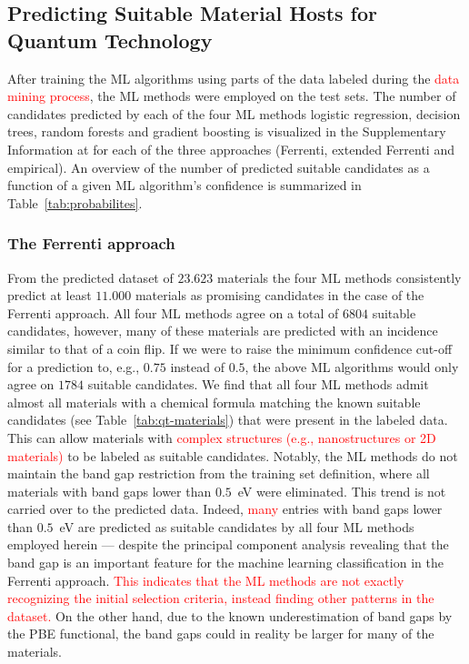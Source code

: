 \documentclass[superscriptaddress,unsortedaddress,
 amsmath,amssymb,
 aps,
]{revtex4-2}
\newcommand{\mrk}[1]{\textcolor{red}{#1}}
\begin{document}
\subsection*{Predicting Suitable Material Hosts for Quantum Technology} 
After training the ML algorithms using parts of the data labeled during the \mrk{data mining process}, the ML methods were employed on the test sets. 
The number of candidates predicted by each of the four ML methods logistic regression, decision trees, random forests and gradient boosting is visualized in the Supplementary Information at \cite{supplementary} for each of the three approaches (Ferrenti, extended Ferrenti and empirical). 
An overview of the number of predicted suitable candidates as a function of a given ML algorithm's confidence is summarized in  Table~\ref{tab:probabilites}. 

\subsubsection*{The Ferrenti approach}

From the predicted dataset of $23.623$ materials 
the four ML methods consistently predict at least $11.000$ materials as promising candidates in the case of the Ferrenti approach. All four ML methods agree on a total of $6804$ suitable candidates, however, many of these materials are predicted with an incidence similar to that of a coin flip. If we were to raise the minimum confidence cut-off for a prediction to, e.g., $0.75$ instead of $0.5$, the above ML algorithms would only agree on $1784$ suitable candidates. 
We find that all four ML methods admit almost all materials with a chemical formula matching the known suitable candidates (see Table~\ref{tab:qt-materials}) that were present in the labeled data. This can allow materials with \mrk{complex structures (e.g., nanostructures or 2D materials)} to be labeled as suitable candidates. Notably, the ML methods do not maintain the band gap restriction from the training set definition, where all materials with band gaps lower than $0.5$~eV were eliminated. 
This trend is not carried over to the predicted data. Indeed, \mrk{many} entries with band gaps lower than $0.5$~eV are predicted as suitable candidates by all four ML methods employed herein 
--- despite the principal component analysis revealing that the band gap is an important feature for the machine learning classification in the Ferrenti approach. \mrk{This indicates that the ML methods are not exactly recognizing the initial selection criteria, instead finding other patterns in the dataset.} 
On the other hand, due to the known  underestimation of band gaps by the PBE  functional, the band gaps could in reality be larger for many of the materials. 
\end{document}
